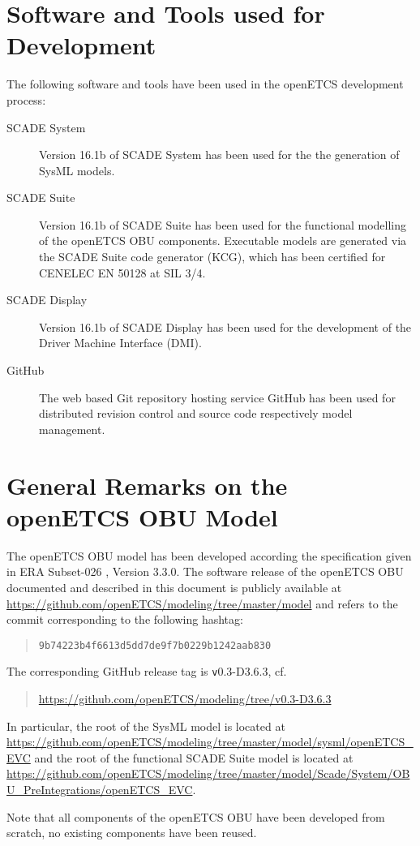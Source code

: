 \section{Software and Tools used for Development}

The following software and tools have been used in the openETCS development process:
\begin{description}
\item[SCADE System] Version 16.1b of SCADE System has been used for the the generation of SysML models.
\item[SCADE Suite] Version 16.1b of SCADE Suite has been used for the functional modelling of the openETCS OBU components. Executable models are generated via the SCADE Suite code generator (KCG), which has been certified for CENELEC EN 50128 at SIL 3/4.
\item[SCADE Display] Version 16.1b of SCADE Display has been used for the development of the Driver Machine Interface (DMI).
\item[GitHub] The web based Git repository hosting service GitHub has been used for distributed revision control and source code respectively model management.
\end{description}


\section{General Remarks on the openETCS OBU Model}
The openETCS OBU model has been developed according the specification given in ERA Subset-026 \cite{subset-026}, Version 3.3.0. The software release of the openETCS OBU documented and described in this document is publicly available at \url{https://github.com/openETCS/modeling/tree/master/model} and refers to the commit corresponding to the following hashtag:
\begin{quotation}
\centering
\texttt{9b74223b4f6613d5dd7de9f7b0229b1242aab830}
\end{quotation}
The corresponding GitHub release tag is {\texttt v0.3-D3.6.3}, cf.
\begin{quotation}
\centering
\url{https://github.com/openETCS/modeling/tree/v0.3-D3.6.3}
\end{quotation}


In particular, the root of the SysML model is located at
\url{https://github.com/openETCS/modeling/tree/master/model/sysml/openETCS_EVC}
and the root of the functional SCADE Suite model is located at
\url{https://github.com/openETCS/modeling/tree/master/model/Scade/System/OBU_PreIntegrations/openETCS_EVC}.

Note that all components of the openETCS OBU have been developed from scratch, no existing components have been reused.